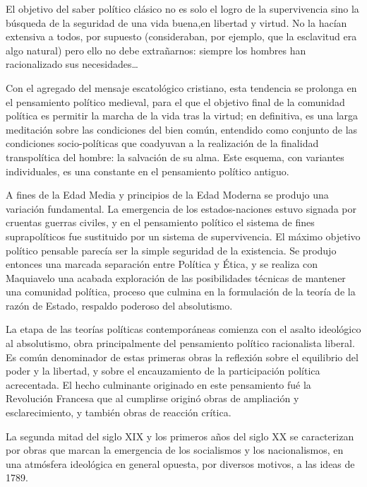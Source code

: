 \documentclass[
]{book}
\begin{document}
El objetivo del saber político clásico no es solo el logro de la supervivencia sino la búsqueda de la seguridad de una vida buena,en libertad y virtud. No la hacían extensiva a todos, por supuesto (consideraban, por ejemplo, que la esclavitud era algo natural) pero ello no debe extrañarnos: siempre los hombres han racionalizado sus necesidades\ldots{}

Con el agregado del mensaje escatológico cristiano, esta tendencia se prolonga en el pensamiento político medieval, para el que el objetivo final de la comunidad política es permitir la marcha de la vida tras la virtud; en definitiva, es una larga meditación sobre las condiciones del bien común, entendido como conjunto de las condiciones socio-políticas que coadyuvan a la realización de la finalidad transpolítica del hombre: la salvación de su alma. Este esquema, con variantes individuales, es una constante en el pensamiento político antiguo.

A fines de la Edad Media y principios de la Edad Moderna se produjo una variación fundamental. La emergencia de los estados-naciones estuvo signada por cruentas guerras civiles, y en el pensamiento político el sistema de fines suprapolíticos fue sustituido por un sistema de supervivencia. El máximo objetivo político pensable parecía ser la simple seguridad de la existencia. Se produjo entonces una marcada separación entre Política y Ética, y se realiza con Maquiavelo una acabada exploración de las posibilidades técnicas de mantener una comunidad política, proceso que culmina en la formulación de la teoría de la razón de Estado, respaldo poderoso del absolutismo.

La etapa de las teorías políticas contemporáneas comienza con el asalto ideológico al absolutismo, obra principalmente del pensamiento político racionalista liberal. Es común denominador de estas primeras obras la reflexión sobre el equilibrio del poder y la libertad, y sobre el encauzamiento de la participación política acrecentada. El hecho culminante originado en este pensamiento fué la Revolución Francesa que al cumplirse originó obras de ampliación y esclarecimiento, y también obras de reacción crítica.

La segunda mitad del siglo XIX y los primeros años del siglo XX se caracterizan por obras que marcan la emergencia de los socialismos y los nacionalismos, en una atmósfera ideológica en general opuesta, por diversos motivos, a las ideas de 1789.
\end{document}
